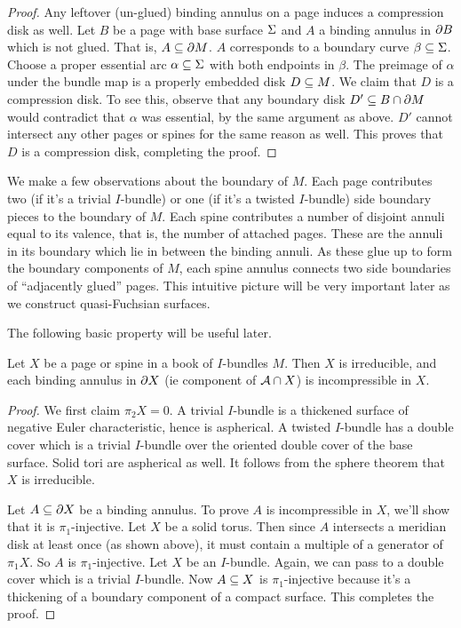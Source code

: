 \begin{proof}
Any leftover (un-glued) binding annulus on a page induces a compression disk as
well. Let $B$ be a page with base surface $\Sigma$ and $A$ a binding annulus in
$\partial B$ which is not glued. That is, $A \subseteq \partial M$. $A$ corresponds to
a boundary curve $\beta \subseteq \Sigma$. Choose a proper essential arc $\alpha \subseteq
\Sigma$ with both endpoints in $\beta$. The preimage of $\alpha$ under the bundle
map is a properly embedded disk $D \subseteq M$. We claim that $D$ is a compression
disk. To see this, observe that any boundary disk $D' \subseteq B \cap \partial M$ would
contradict that $\alpha$ was essential, by the same argument as above. $D'$
cannot intersect any other pages or spines for the same reason as well. This
proves that $D$ is a compression disk, completing the proof.

\end{proof}


We make a few observations about the boundary of $M$. Each page contributes two
(if it's a trivial $I$-bundle) or one (if it's a twisted $I$-bundle) side
boundary pieces to the boundary of $M$. Each spine contributes a number of
disjoint annuli equal to its valence, that is, the number of attached pages.
These are the annuli in its boundary which lie in between the binding annuli.
As these glue up to form the boundary components of $M$, each spine annulus
connects two side boundaries of ``adjacently glued'' pages. This intuitive
picture will be very important later as we construct quasi-Fuchsian surfaces.

The following basic property will be useful later.

\begin{prop}\label{P:pagespineII}

Let $X$ be a page or spine in a book of $I$-bundles $M$. Then $X$ is
irreducible, and each binding annulus in $\partial X$ (ie component of $\mathcal{A} \cap X$)
is incompressible in $X$.

\end{prop}

\begin{proof}

We first claim $\pi_2X = 0$. A trivial $I$-bundle is a thickened surface of
negative Euler characteristic, hence is aspherical. A twisted $I$-bundle has
a double cover which is a trivial $I$-bundle over the oriented double cover of
the base surface. Solid tori are aspherical as well. It follows from the sphere
theorem that $X$ is irreducible.

Let $A \subseteq \partial X$ be a binding annulus. To prove $A$ is incompressible in $X$,
we'll show that it is $\pi_1$-injective. Let $X$ be a solid torus. Then since
$A$ intersects a meridian disk at least once (as shown above), it must contain
a multiple of a generator of $\pi_1X$. So $A$ is $\pi_1$-injective. Let $X$ be
an $I$-bundle. Again, we can pass to a double cover which is a trivial
$I$-bundle.  Now $A \subseteq X$ is $\pi_1$-injective because it's a thickening of
a boundary component of a compact surface. This completes the proof.

\end{proof}

